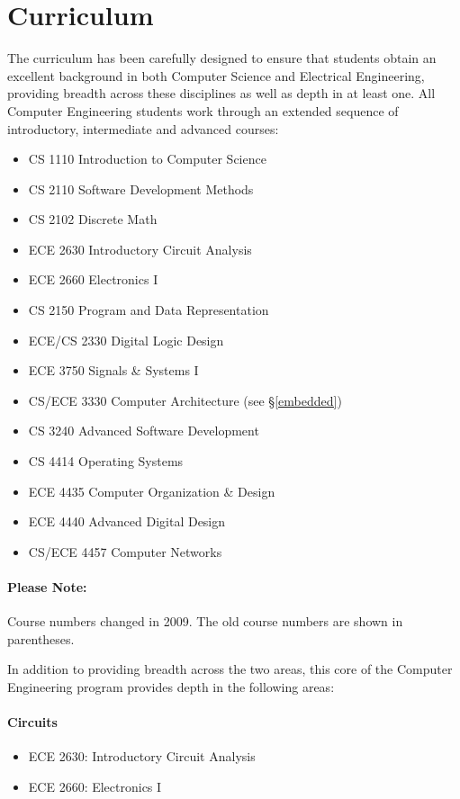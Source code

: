 \documentclass[10pt,letter]{book}
\newenvironment{itemlist}{
\begin{itemize}
\setlength{\itemsep}{0pt}
\setlength{\parskip}{0pt}}
{\end{itemize}}
\newcommand{\mysection}[1]{\section{#1}\renewcommand{\rightmark}{#1}}
\begin{document}
\mysection{Curriculum} %

The curriculum has been carefully designed to ensure that students
obtain an excellent background in both Computer Science and Electrical
Engineering, providing breadth across these disciplines as well as
depth in at least one. All Computer Engineering students work through
an extended sequence of introductory, intermediate and advanced
courses:

\begin{itemlist}
\item CS 1110 Introduction to Computer Science
\item CS 2110 Software Development Methods
\item CS 2102 Discrete Math
\item ECE 2630 Introductory Circuit Analysis
\item ECE 2660 Electronics I
\item CS 2150 Program and Data Representation
\item ECE/CS 2330 Digital Logic Design
\item ECE 3750 Signals \& Systems I
\item CS/ECE 3330 Computer Architecture (see \S\ref{embedded})
\item CS 3240 Advanced Software Development
\item CS 4414 Operating Systems
\item ECE 4435 Computer Organization \& Design
\item ECE 4440 Advanced Digital Design
\item CS/ECE 4457 Computer Networks
\end{itemlist}

\paragraph{Please Note:} Course numbers changed in 2009. The old 
course numbers are shown in parentheses.

In addition to providing breadth across the two areas,
this core of the Computer Engineering program provides
depth in the following areas:

\paragraph{Circuits}
\begin{itemlist}
\item ECE 2630: Introductory Circuit Analysis
\item ECE 2660: Electronics I
\end{itemlist}
\end{document}
